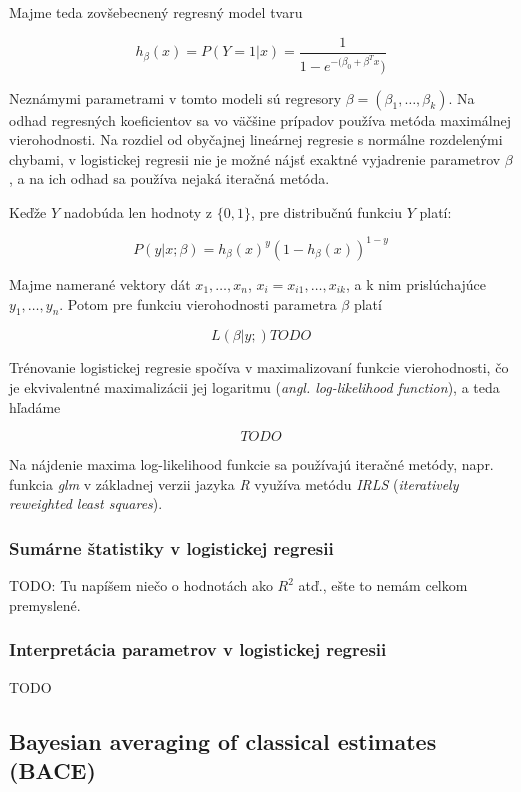 Majme teda zovšebecnený regresný model tvaru

\[
h_\beta(x) = P(Y = 1|x) = \frac{1}{1 - e^{-(\beta_0 + \beta^T x})}
\]

Neznámymi parametrami v tomto modeli sú regresory \( \beta = (\beta_1, \ldots, \beta_k) \).
Na odhad regresných koeficientov sa vo väčšine prípadov používa metóda maximálnej vierohodnosti.
Na rozdiel od obyčajnej lineárnej regresie s normálne rozdelenými chybami, v logistickej regresii nie je možné nájsť exaktné vyjadrenie parametrov \( \beta \),
a na ich odhad sa používa nejaká iteračná metóda.

Keďže \(Y\) nadobúda len hodnoty z \( \{0, 1\} \), pre distribučnú funkciu \(Y\) platí:

\[
P(y | x; \beta ) = h_\beta(x)^y (1 - h_\beta(x))^{1 - y}
\]

Majme namerané vektory dát \( x_1, \ldots, x_n \), \( x_i = x_{i1}, \ldots, x_{ik} \),
a k nim prislúchajúce \( y_1, \ldots, y_n \). Potom pre funkciu vierohodnosti parametra \( \beta \) platí

\[
L(\beta | y; ) TODO
\]

Trénovanie logistickej regresie spočíva v maximalizovaní funkcie vierohodnosti,
čo je ekvivalentné maximalizácii jej logaritmu (\emph{angl. log-likelihood function}), a teda hľadáme

\[
TODO
\]

Na nájdenie maxima log-likelihood funkcie sa používajú iteračné metódy,
napr. funkcia \emph{glm} v základnej verzii jazyka \emph{R} využíva metódu \emph{IRLS} (\emph{iteratively reweighted least squares}).

\subsubsection{Sumárne štatistiky v logistickej regresii}

TODO: Tu napíšem niečo o hodnotách ako \(R^2\) atď., ešte to nemám celkom premyslené.

\subsubsection{Interpretácia parametrov v logistickej regresii}

TODO

\subsection{Bayesian averaging of classical estimates (BACE)}

